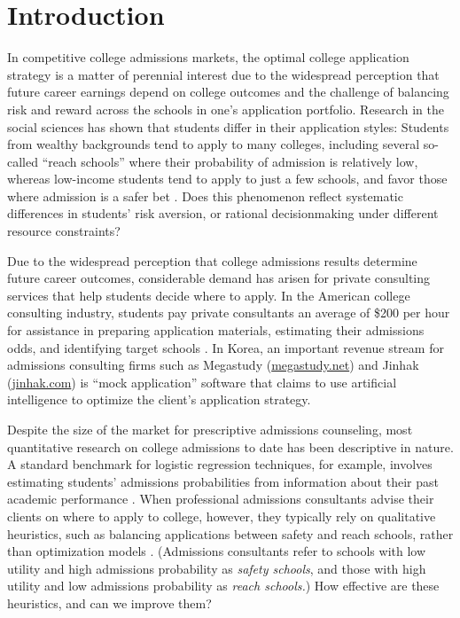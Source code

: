 \section{Introduction}

In competitive college admissions markets, the optimal college application strategy is a matter of perennial interest due to the widespread perception that future career earnings depend on college outcomes and the challenge of balancing risk and reward across the schools in one's application portfolio. Research in the social sciences has shown that students differ in their application styles: Students from wealthy backgrounds tend to apply to many colleges, including several so-called ``reach schools'' where their probability of admission is relatively low, whereas low-income students tend to apply to just a few schools, and favor those where admission is a safer bet \cite{hartlaubandschneider2012,vanhuizenandalessie2019}. Does this phenomenon reflect systematic differences in students' risk aversion, or rational decisionmaking under different resource constraints? 

Due to the widespread perception that college admissions results determine future career outcomes, considerable demand has arisen for private consulting services that help students decide where to apply. In the American college consulting industry, students pay private consultants an average of \$200 per hour for assistance in preparing application materials, estimating their admissions odds, and identifying target schools \cite{sklarow2018}. In Korea, an important revenue stream for admissions consulting firms such as Megastudy (\url{megastudy.net}) and Jinhak (\url{jinhak.com}) is ``mock application'' software that claims to use artificial intelligence to optimize the client's application strategy.

Despite the size of the market for prescriptive admissions counseling, most quantitative research on college admissions to date has been descriptive in nature. A standard benchmark for logistic regression techniques, for example, involves estimating students' admissions probabilities from information about their past academic performance \cite{acharyaetal2019,lim2013}. When professional admissions consultants advise their clients on where to apply to college, however, they typically rely on qualitative heuristics, such as balancing applications between safety and reach schools, rather than optimization models \cite{jeon2015,peck2021}. (Admissions consultants refer to schools with low utility and high admissions probability as \emph{safety schools}, and those with high utility and low admissions probability as \emph{reach schools.}) How effective are these heuristics, and can we improve them?

